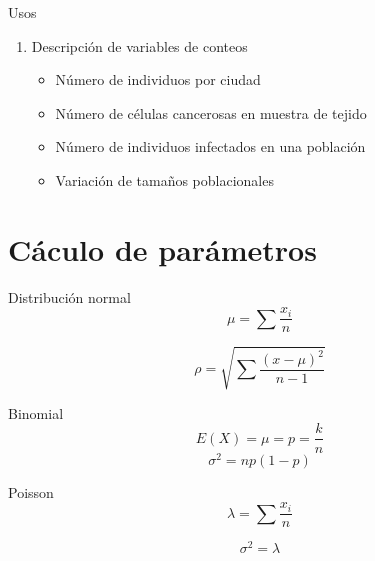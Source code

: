 \documentclass[
  11pt,
  ignorenonframetext,
]{beamer}
\providecommand{\tightlist}{%
  \setlength{\itemsep}{0pt}\setlength{\parskip}{0pt}}
\begin{document}
\begin{frame}{Usos}
\protect\hypertarget{usos-1}{}
\begin{enumerate}
\item
  Descripción de variables de conteos

  \begin{itemize}
  \tightlist
  \item
    Número de individuos por ciudad
  \item
    Número de células cancerosas en muestra de tejido
  \item
    Número de individuos infectados en una población
  \item
    Variación de tamaños poblacionales
  \end{itemize}
\end{enumerate}
\end{frame}

\hypertarget{cuxe1culo-de-paruxe1metros}{%
\section{Cáculo de parámetros}\label{cuxe1culo-de-paruxe1metros}}

\begin{frame}{Distribución normal}
\protect\hypertarget{distribuciuxf3n-normal}{}
\[\mu = \sum \frac{x_i}{n}\]

\[\rho = \sqrt{ \sum \frac{(x-\mu)^2}{n-1}}\]
\end{frame}

\begin{frame}{Binomial}
\protect\hypertarget{binomial-1}{}
\[ E(X) = \mu = p = \frac{k}{n} \] \[ \sigma^2 = np(1-p)\]
\end{frame}

\begin{frame}{Poisson}
\protect\hypertarget{poisson-2}{}
\[ \lambda = \sum \frac{x_i}{n}\]

\[ \sigma^2 = \lambda \]
\end{frame}
\end{document}
